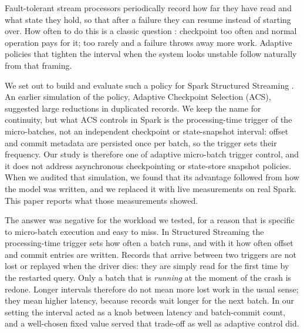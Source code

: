 \documentclass[10pt,twocolumn]{article}
\begin{document}
Fault-tolerant stream processors periodically record how far they have read and
what state they hold, so that after a failure they can resume instead of
starting over. How often to do this is a classic question
\cite{young1974first,daly2006higher}: checkpoint too often and normal operation
pays for it; too rarely and a failure throws away more work. Adaptive policies
that tighten the interval when the system looks unstable follow naturally from
that framing.

We set out to build and evaluate such a policy for Spark Structured Streaming
\cite{armbrust2018structured}. An earlier simulation of the policy, Adaptive
Checkpoint Selection (ACS), suggested large reductions in duplicated records.
We keep the name for continuity, but what ACS controls in Spark is the
processing-time trigger of the micro-batches, not an independent checkpoint or
state-snapshot interval: offset and commit metadata are persisted once per
batch, so the trigger sets their frequency. Our study is therefore one of
adaptive micro-batch trigger control, and it does not address asynchronous
checkpointing or state-store snapshot policies.
When we audited that simulation, we found that its advantage followed from how
the model was written, and we replaced it with live measurements on real Spark.
This paper reports what those measurements showed.

The answer was negative for the workload we tested, for a reason that is
specific to micro-batch execution and easy to miss. In Structured Streaming the
processing-time trigger sets how often a batch runs, and with it how often
offset and commit entries are written.
Records that arrive between two triggers are not lost or replayed when the
driver dies: they are simply read for the first time by the restarted query.
Only a batch that is \emph{running} at the moment of the crash is redone. Longer
intervals therefore do not mean more lost work in the usual sense; they mean
higher latency, because records wait longer for the next batch. In our setting
the interval acted as a knob between latency and batch-commit count, and a
well-chosen fixed value served that trade-off as well as adaptive control did.
\end{document}
